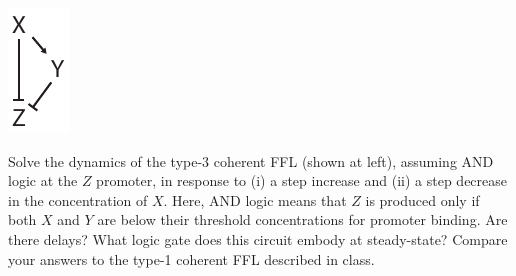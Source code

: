 \documentclass{article}
\begin{document}
\begin{minipage}[b]{0.1\linewidth}
\includegraphics[width=\textwidth]{c3ffl.pdf}
\end{minipage}
\hspace{0.5cm}
\begin{minipage}[b]{0.85\linewidth}
Solve the dynamics of the type-3 coherent FFL (shown at left), assuming AND logic at the $Z$ promoter, in response to (i) a step increase and (ii) a step decrease in the concentration of $X$. Here, AND logic means that $Z$ is produced only if both $X$ and $Y$ are below their threshold concentrations for promoter binding. Are there delays? What logic gate does this circuit embody at steady-state? Compare your answers to the type-1 coherent FFL described in class.\\

\end{minipage}
\end{document}
